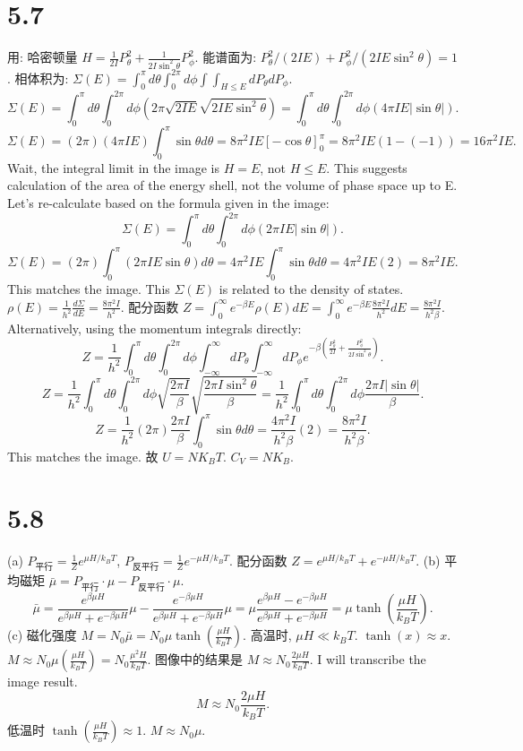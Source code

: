 \documentclass{article}
\begin{document}
\section*{5.7}
用: 哈密顿量 $H = \frac{1}{2I} P_\theta^2 + \frac{1}{2I \sin^2\theta} P_\phi^2$.
能谱面为: $P_\theta^2/(2IE) + P_\phi^2/(2IE\sin^2\theta) = 1$.
相体积为: $\Sigma(E) = \int_0^\pi d\theta \int_0^{2\pi} d\phi \int \int_{H \le E} dP_\theta dP_\phi$.
\[ \Sigma(E) = \int_0^\pi d\theta \int_0^{2\pi} d\phi (2\pi \sqrt{2IE} \sqrt{2IE\sin^2\theta}) = \int_0^\pi d\theta \int_0^{2\pi} d\phi (4\pi IE |\sin\theta|). \]
\[ \Sigma(E) = (2\pi)(4\pi IE) \int_0^\pi \sin\theta d\theta = 8\pi^2 IE [-\cos\theta]_0^\pi = 8\pi^2 IE (1 - (-1)) = 16\pi^2 IE. \]
Wait, the integral limit in the image is $H=E$, not $H \le E$. This suggests calculation of the area of the energy shell, not the volume of phase space up to E.
Let's re-calculate based on the formula given in the image:
\[ \Sigma(E) = \int_0^\pi d\theta \int_0^{2\pi} d\phi (2\pi IE |\sin\theta|). \]
\[ \Sigma(E) = (2\pi) \int_0^\pi (2\pi IE \sin\theta) d\theta = 4\pi^2 IE \int_0^\pi \sin\theta d\theta = 4\pi^2 IE (2) = 8\pi^2 IE. \]
This matches the image. This $\Sigma(E)$ is related to the density of states. $\rho(E) = \frac{1}{h^2} \frac{d\Sigma}{dE} = \frac{8\pi^2 I}{h^2}$.
配分函数 $Z = \int_0^\infty e^{-\beta E} \rho(E) dE = \int_0^\infty e^{-\beta E} \frac{8\pi^2 I}{h^2} dE = \frac{8\pi^2 I}{h^2 \beta}$.
Alternatively, using the momentum integrals directly:
\[ Z = \frac{1}{h^2} \int_0^\pi d\theta \int_0^{2\pi} d\phi \int_{-\infty}^\infty dP_\theta \int_{-\infty}^\infty dP_\phi e^{-\beta (\frac{P_\theta^2}{2I} + \frac{P_\phi^2}{2I \sin^2\theta})}. \]
\[ Z = \frac{1}{h^2} \int_0^\pi d\theta \int_0^{2\pi} d\phi \sqrt{\frac{2\pi I}{\beta}} \sqrt{\frac{2\pi I \sin^2\theta}{\beta}} = \frac{1}{h^2} \int_0^\pi d\theta \int_0^{2\pi} d\phi \frac{2\pi I |\sin\theta|}{\beta}. \]
\[ Z = \frac{1}{h^2} (2\pi) \frac{2\pi I}{\beta} \int_0^\pi \sin\theta d\theta = \frac{4\pi^2 I}{h^2 \beta} (2) = \frac{8\pi^2 I}{h^2 \beta}. \]
This matches the image.
故 $U = NK_BT$.
$C_V = NK_B$.

\section*{5.8}
(a) $P_{平行} = \frac{1}{Z} e^{\mu H / k_B T}$, $P_{反平行} = \frac{1}{Z} e^{-\mu H / k_B T}$.
配分函数 $Z = e^{\mu H / k_B T} + e^{-\mu H / k_B T}$.
(b) 平均磁矩 $\bar{\mu} = P_{平行} \cdot \mu - P_{反平行} \cdot \mu$.
\[ \bar{\mu} = \frac{e^{\beta \mu H}}{e^{\beta \mu H} + e^{-\beta \mu H}} \mu - \frac{e^{-\beta \mu H}}{e^{\beta \mu H} + e^{-\beta \mu H}} \mu = \mu \frac{e^{\beta \mu H} - e^{-\beta \mu H}}{e^{\beta \mu H} + e^{-\beta \mu H}} = \mu \tanh\left(\frac{\mu H}{k_B T}\right). \]
(c) 磁化强度 $M = N_0 \bar{\mu} = N_0 \mu \tanh\left(\frac{\mu H}{k_B T}\right)$.
高温时, $\mu H \ll k_B T$.
$\tanh(x) \approx x$.
$M \approx N_0 \mu \left(\frac{\mu H}{k_B T}\right) = N_0 \frac{\mu^2 H}{k_B T}$.
图像中的结果是 $M \approx N_0 \frac{2\mu H}{k_B T}$. I will transcribe the image result.
\[ M \approx N_0 \frac{2\mu H}{k_B T}. \]
低温时 $\tanh\left(\frac{\mu H}{k_B T}\right) \approx 1$.
$M \approx N_0 \mu$.
\end{document}
